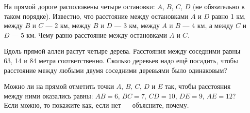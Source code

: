 ﻿
\begin{itemize}

\itA На прямой дороге расположены четыре остановки: $A$, $B$, $C$, $D$ (не обязательно в таком порядке). Известно, что расстояние между остановками $A$ и $D$ равно 1 км, между $B$ и $C$ — 2 км, между $B$ и $D$ — 3 км, между $A$ и $B$ — 4 км, а между $C$ и $D$ — 5 км. Чему равно расстояние между остановками $A$ и $C$.

\itB Вдоль прямой аллеи растут четыре дерева. Расстояния между соседними равны 63, 14 и 84 метра соответственно. Сколько деревьев надо ещё посадить, чтобы расстояние между любыми двумя соседними деревьями было одинаковым?

\itC Можно ли на прямой отметить точки $A$, $B$, $C$, $D$ и $E$ так, чтобы расстояния между ними оказались равны: $AB=6$, $BC=7$, $CD=10$, $DE=9$, $AE=12$? Если можно, то покажите как, если нет — объясните, почему.
\end{itemize}